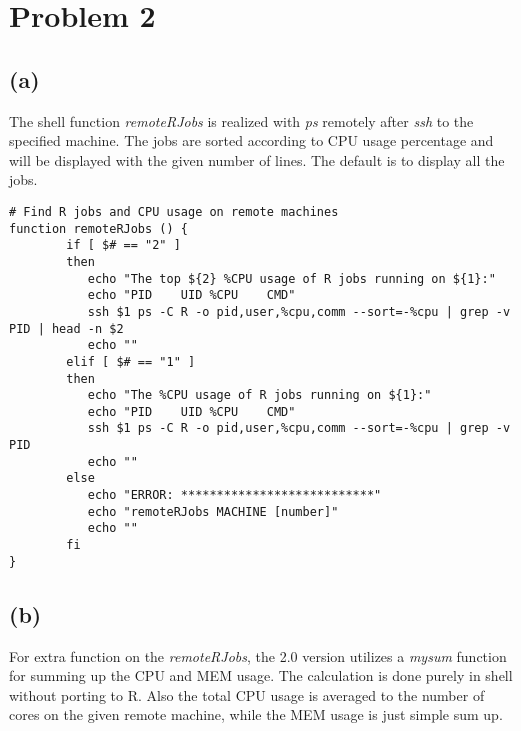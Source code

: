 \documentclass{article}
\begin{document}



\newpage

\section*{Problem 2}
\subsection*{(a)}

The shell function \textit{remoteRJobs} is realized with \textit{ps} remotely after \textit{ssh} to the
specified machine. The jobs are sorted according to CPU usage percentage and will be displayed with the given number of lines. The default is to display all the jobs.

\begin{lstlisting}
# Find R jobs and CPU usage on remote machines
function remoteRJobs () {
		if [ $# == "2" ]
		then 
		   echo "The top ${2} %CPU usage of R jobs running on ${1}:" 
		   echo "PID	UID	%CPU	CMD"
		   ssh $1 ps -C R -o pid,user,%cpu,comm --sort=-%cpu | grep -v PID | head -n $2
		   echo ""
		elif [ $# == "1" ]
		then 
		   echo "The %CPU usage of R jobs running on ${1}:" 
		   echo "PID	UID	%CPU	CMD"
		   ssh $1 ps -C R -o pid,user,%cpu,comm --sort=-%cpu | grep -v PID
		   echo ""
		else
		   echo "ERROR: ***************************"
		   echo "remoteRJobs MACHINE [number]"
		   echo ""
		fi 
}
\end{lstlisting}


\subsection*{(b)}

For extra function on the \textit{remoteRJobs}, the 2.0 version utilizes a \textit{mysum} function for summing up the CPU and MEM usage. The calculation is done purely in shell without porting to R. Also the total CPU usage is averaged to the number of cores on the given remote machine, while the MEM usage is just simple sum up.
\end{document}

